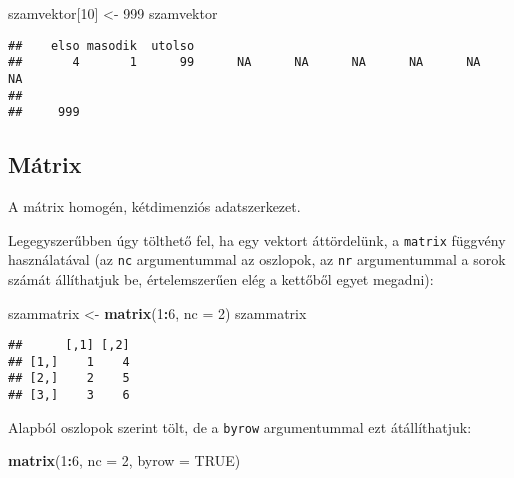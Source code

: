 \documentclass[]{book}
\newenvironment{Shaded}{\begin{snugshade}}{\end{snugshade}}
\newcommand{\DataTypeTok}[1]{\textcolor[rgb]{0.13,0.29,0.53}{#1}}
\newcommand{\DecValTok}[1]{\textcolor[rgb]{0.00,0.00,0.81}{#1}}
\newcommand{\KeywordTok}[1]{\textcolor[rgb]{0.13,0.29,0.53}{\textbf{#1}}}
\newcommand{\NormalTok}[1]{#1}
\newcommand{\OperatorTok}[1]{\textcolor[rgb]{0.81,0.36,0.00}{\textbf{#1}}}
\newcommand{\OtherTok}[1]{\textcolor[rgb]{0.56,0.35,0.01}{#1}}
\newcommand{\StringTok}[1]{\textcolor[rgb]{0.31,0.60,0.02}{#1}}
\begin{document}
\begin{Shaded}
\begin{Highlighting}[]
\NormalTok{szamvektor[}\DecValTok{10}\NormalTok{] <-}\StringTok{ }\DecValTok{999}
\NormalTok{szamvektor}
\end{Highlighting}
\end{Shaded}

\begin{verbatim}
##    elso masodik  utolso                                                 
##       4       1      99      NA      NA      NA      NA      NA      NA 
##         
##     999
\end{verbatim}

\hypertarget{muxe1trix}{%
\subsection{Mátrix}\label{muxe1trix}}

A mátrix homogén, kétdimenziós adatszerkezet.

Legegyszerűbben úgy tölthető fel, ha egy vektort áttördelünk, a \texttt{matrix} függvény használatával (az \texttt{nc} argumentummal az oszlopok, az \texttt{nr} argumentummal a sorok számát állíthatjuk be, értelemszerűen elég a kettőből egyet megadni):

\begin{Shaded}
\begin{Highlighting}[]
\NormalTok{szammatrix <-}\StringTok{ }\KeywordTok{matrix}\NormalTok{(}\DecValTok{1}\OperatorTok{:}\DecValTok{6}\NormalTok{, }\DataTypeTok{nc =} \DecValTok{2}\NormalTok{)}
\NormalTok{szammatrix}
\end{Highlighting}
\end{Shaded}

\begin{verbatim}
##      [,1] [,2]
## [1,]    1    4
## [2,]    2    5
## [3,]    3    6
\end{verbatim}

Alapból oszlopok szerint tölt, de a \texttt{byrow} argumentummal ezt átállíthatjuk:

\begin{Shaded}
\begin{Highlighting}[]
\KeywordTok{matrix}\NormalTok{(}\DecValTok{1}\OperatorTok{:}\DecValTok{6}\NormalTok{, }\DataTypeTok{nc =} \DecValTok{2}\NormalTok{, }\DataTypeTok{byrow =} \OtherTok{TRUE}\NormalTok{)}
\end{Highlighting}
\end{Shaded}
\end{document}
